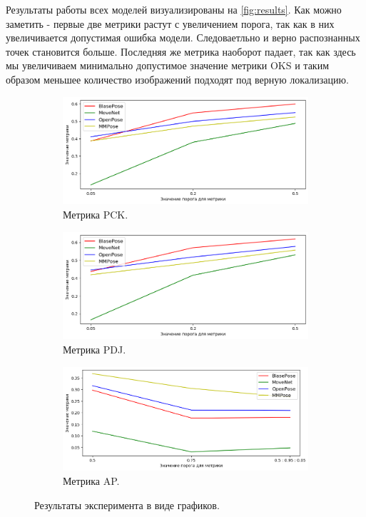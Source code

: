 Результаты работы всех моделей визуализированы на \autoref{fig:results}. Как можно заметить - первые две метрики растут с увеличением порога, так как в них увеличивается допустимая ошибка модели. Следоваетльно и верно распознанных точек становится больше. Последняя же метрика наоборот падает, так как здесь мы увеличиваем минимально допустимое значение метрики OKS и таким образом меньшее количество изображений подходят под верную локализацию.

\begin{figure}
\begin{subfigure}[b]{0.8\textwidth}
	\centering
	\includegraphics[width=\textwidth]{./images/results/PCK}
	\caption{Метрика PCK.}
\end{subfigure}
\begin{subfigure}[b]{0.8\textwidth}
	\centering
    \includegraphics[width=\textwidth]{./images/results/PDJ}
    \caption{Метрика PDJ.}
\end{subfigure}
\begin{subfigure}[b]{0.8\textwidth}
	\centering
    \includegraphics[width=\textwidth]{./images/results/AP}
    \caption{Метрика AP.}
\end{subfigure}
    \caption{Результаты эксперимента в виде графиков.}
    \label{fig:results}
\end{figure}

\newpage
\newpage
\hfill
\newpage
